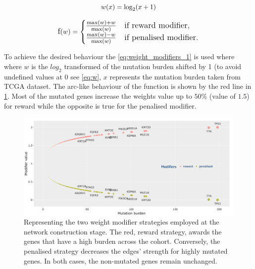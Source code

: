 \begin{equation} \label{eq:w}
    \large{
    w(x) = \log_2(x+1)
    }
\end{equation}

\begin{equation} \label{eq:weight_modifiers_1}
    \large{
    \text{f}(w) = 
    \begin{cases} 
    \frac{\max(w) + w}{\max(w)} & \text{if reward modifier}, \\
    \frac{\max(w) - w}{\max(w)} & \text{if penalised modifier}.
    \end{cases}
    }
\end{equation}

To achieve the desired behaviour the \cref{eq:weight_modifiers_1} is used where where $w$ is the $log_2$ transformed of the mutation burden shifted by 1 (to avoid undefined values at 0 see \cref{eq:w}, $x$ represents the mutation burden taken from TCGA dataset.  The arc-like behaviour of the function is shown by the red line in \cref{fig:N_I:modifiers}. Most of the mutated genes increase the weights value up to $50\%$ (value of $1.5$) for reward while the opposite is true for the penalised modifier. 



\begin{figure}[!htb]    
    \centering
    \includegraphics[width=1.0\textwidth,keepaspectratio]{Sections/Network_I/Resources/Methods/modifiers.png}
    \caption[Reward v1 vs Penalised edge weight modifiers]{Representing the two weight modifier strategies employed at the network construction stage. The red, reward strategy, awards the genes that have a high burden across the cohort. Conversely, the  penalised strategy decreases the edges' strength for highly mutated genes. In both cases, the non-mutated genes remain unchanged.}
    \label{fig:N_I:modifiers}
\end{figure}


